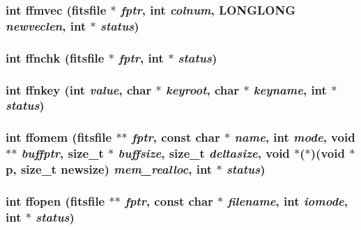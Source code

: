 \subsubsection{\setlength{\rightskip}{0pt plus 5cm}int ffmvec (\bf{fitsfile} $\ast$ {\em fptr}, int {\em colnum}, \bf{LONGLONG} {\em newveclen}, int $\ast$ {\em status})}\label{fitsio__64_8h_4d65fa6c7cdfb529d91ceeed740985b3}


\subsubsection{\setlength{\rightskip}{0pt plus 5cm}int ffnchk (\bf{fitsfile} $\ast$ {\em fptr}, int $\ast$ {\em status})}\label{fitsio__64_8h_3045d84f13f392c7d7600c5d734f4db7}


\subsubsection{\setlength{\rightskip}{0pt plus 5cm}int ffnkey (int {\em value}, char $\ast$ {\em keyroot}, char $\ast$ {\em keyname}, int $\ast$ {\em status})}\label{fitsio__64_8h_246d87f69e3a02a1105b9013ca8f4409}


\subsubsection{\setlength{\rightskip}{0pt plus 5cm}int ffomem (\bf{fitsfile} $\ast$$\ast$ {\em fptr}, const char $\ast$ {\em name}, int {\em mode}, void $\ast$$\ast$ {\em buffptr}, size\_\-t $\ast$ {\em buffsize}, size\_\-t {\em deltasize}, void $\ast$($\ast$)(void $\ast$p, size\_\-t newsize) {\em mem\_\-realloc}, int $\ast$ {\em status})}\label{fitsio__64_8h_d76715975f2022594bbce821ab9d5d81}


\subsubsection{\setlength{\rightskip}{0pt plus 5cm}int ffopen (\bf{fitsfile} $\ast$$\ast$ {\em fptr}, const char $\ast$ {\em filename}, int {\em iomode}, int $\ast$ {\em status})}\label{fitsio__64_8h_c42982e168064c85aefcc72de41d1ce9}


